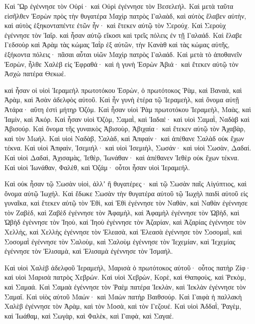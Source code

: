 {Καὶ Ὣρ ἐγέννησε τὸν Οὐρί· καὶ Οὐρὶ ἐγέννησε τὸν Βεσελεήλ.
Καὶ μετὰ ταῦτα εἰσῆλθεν Ἐσρὼν πρὸς τὴν θυγατέρα Μαχὶρ πατρὸς Γαλαὰδ, καὶ αὐτὸς ἔλαβεν αὐτὴν, καὶ αὐτὸς ἑξηκονταπέντε ἐτῶν ἦν· καὶ ἔτεκεν αὐτῷ τὸν Σερούχ.
Καὶ Σεροὺχ ἐγέννησε τὸν Ἰαΐρ. καὶ ἦσαν αὐτῷ εἴκοσι καὶ τρεῖς πόλεις ἐν τῇ Γαλαάδ.
Καὶ ἔλαβε Γεδσοὺρ καὶ Ἀρὰμ τὰς κώμας Ἰαῒρ ἐξ αὐτῶν, τὴν Κανὰθ καὶ τὰς κώμας αὐτῆς, ἑξήκοντα πόλεις· πᾶσαι αὗται υἱῶν Μαχὶρ πατρὸς Γαλαάδ.
Καὶ μετὰ τὸ ἀποθανεῖν Ἐσρὼν, ἦλθε Χαλὲβ εἰς Ἐφραθά· καὶ ἡ γυνὴ Ἐσρὼν Ἀβιά· καὶ ἔτεκεν αὐτῷ τὸν Ἀσχὼ πατέρα Θεκωέ.
\par }{\PP {}καὶ ἦσαν οἱ υἱοὶ Ἱεραμεὴλ πρωτοτόκου Ἐσρὼν, ὁ πρωτότοκος Ῥὰμ, καὶ Βαναὰ, καὶ Ἀρὰμ, καὶ Ἀσὰν ἀδελφὸς αὐτοῦ.
Καὶ ἦν γυνὴ ἑτέρα τῷ Ἱεραμεὴλ, καὶ ὄνομα αὐτῇ Ἀτάρα· αὕτη ἐστὶ μήτηρ Ὀζόμ.
Καὶ ἦσαν υἱοὶ Ῥὰμ πρωτοτόκου Ἱεραμεὴλ, Μαὰς, καὶ Ἰαμὶν, καὶ Ἀκόρ.
Καὶ ἦσαν υἱοὶ Ὀζὸμ, Σαμαῒ, καὶ Ἰαδαέ· καὶ υἱοὶ Σαμαῒ, Ναδὰβ καὶ Ἀβισούρ.
Καὶ ὄνομα τῆς γυναικὸς Ἀβισοὺρ, Ἀβιχαία· καὶ ἔτεκεν αὐτῷ τὸν Ἀχαβὰρ, καὶ τὸν Μωήλ.
Καὶ υἱοὶ Ναδὰβ, Σαλὰδ, καὶ Ἀπφαίν· καὶ ἀπέθανε Σαλὰδ οὐκ ἔχων τέκνα.
Καὶ υἱοὶ Ἀπφαὶν, Ἰσεμιήλ· καὶ υἱοὶ Ἰσεμιὴλ, Σωσάν· καὶ υἱοὶ Σωσὰν, Δαδαί.
Καὶ υἱοὶ Δαδαὶ, Ἀχισαμὰς, Ἰεθὲρ, Ἰωνάθαν· καὶ ἀπέθανεν Ἰεθὲρ οὐκ ἔχων τέκνα.
Καὶ υἱοὶ Ἰωνάθαν, Φαλὲθ, καὶ Ὁζάμ· οὗτοι ἦσαν υἱοὶ Ἱεραμεήλ.
\par }{\PP {}Καὶ οὐκ ἦσαν τῷ Σωσὰν υἱοὶ, ἀλλʼ ἢ θυγατέρες· καὶ τῷ Σωσὰν παῖς Αἰγύπτιος, καὶ ὄνομα αὐτῷ Ἰωχήλ.
Καὶ ἔδωκε Σωσὰν τὴν θυγατέρα αὐτοῦ τῷ Ἰωχὴλ παιδὶ αὐτοῦ εἰς γυναῖκα, καὶ ἔτεκεν αὐτῷ τὸν Ἐθὶ,
καὶ Ἐθὶ ἐγέννησε τὸν Ναθὰν, καὶ Ναθὰν ἐγέννησε τὸν Ζαβὲδ,
καὶ Ζαβὲδ ἐγέννησε τὸν Ἀφαμὴλ, καὶ Ἀφαμὴλ ἐγέννησε τὸν Ὠβὴδ,
καὶ Ὠβὴδ ἐγέννησε τὸν Ἰηοὺ, καὶ Ἰηοὺ ἐγέννησε τὸν Ἀζαρίαν,
καὶ Ἀζαρίας ἐγέννησε τὸν Χελλὴς, καὶ Χελλὴς ἐγέννησε τὸν Ἐλεασὰ,
καὶ Ἐλεασὰ ἐγέννησε τὸν Σοσομαῒ, καὶ Σοσομαῒ ἐγέννησε τὸν Σαλοὺμ,
καὶ Σαλοὺμ ἐγέννησε τὸν Ἰεχεμίαν, καὶ Ἰεχεμίας ἐγέννησε τὸν Ἐλισαμὰ, καὶ Ἐλισαμὰ ἐγέννησε τὸν Ἰσμαήλ.
\par }{\PP {}Καὶ υἱοὶ Χαλὲβ ἀδελφοῦ Ἱεραμεὴλ, Μαρισὰ ὁ πρωτότοκος αὐτοῦ· οὗτος πατὴρ Ζίφ· καὶ υἱοὶ Μαρισὰ πατρὸς Χεβρών.
Καὶ υἱοὶ Χεβρὼν, Κορὲ, καὶ Θαπφοὺς, καὶ Ῥεκὸμ, καὶ Σαμαά.
Καὶ Σαμαὰ ἐγέννησε τὸν Ῥαὲμ πατέρα Ἰεκλὰν, καὶ Ἰεκλὰν ἐγέννησε τὸν Σαμαΐ.
Καὶ υἱὸς αὐτοῦ Μαών· καὶ Μαὼν πατὴρ Βαιθσούρ.
Καὶ Γαιφὰ ἡ παλλακὴ Χαλὲβ ἐγέννησε τὸν Ἀρὰμ, καὶ τὸν Μοσὰ, καὶ τὸν Γεζουέ.
Καὶ υἱοὶ Ἀδδαῒ, Ῥαγὲμ, καὶ Ἰωάθαμ, καὶ Σωγὰρ, καὶ Φαλὲκ, καὶ Γαιφὰ, καὶ Σαγαέ.
}
